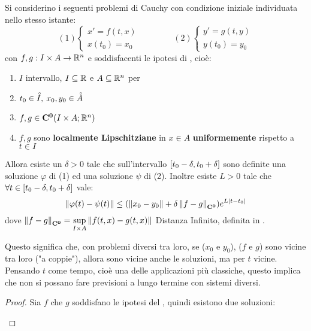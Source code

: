 \begin{theorem}
	\label{teo:cau_locale_part_2}
	Si considerino i seguenti problemi di Cauchy con condizione iniziale individuata nello stesso istante:
	\begin{equation}
		\label{eq:ipot_cau_part_2}
		(1)\begin{cases}x'=f(t,x)\\x(t_0)=x_0\end{cases}
		\qquad\qquad
		(2)\begin{cases}y'=g(t,y)\\y(t_0)=y_0\end{cases}
	\end{equation}
	con $f,g:I\times A \to \mathbb{R}^n$ e soddisfacenti le ipotesi di , cioè:
	\begin{enumerate}
		\item $I$ intervallo, $I \subseteq \mathbb{R}$ e $A\subseteq \mathbb{R}^n$ per 
		\item $t_0\in \accentset{\circ}{I},\:x_0, y_0\in \accentset{\circ}{A}$
		\item $f,g\in \mathbf{C^{0}}(I\times A; \mathbb{R}^n)$
		\item $f,g$ sono \textbf{localmente Lipschitziane} in $x\in A$ \textbf{uniformemente} rispetto a $t\in I$
	\end{enumerate}
	Allora esiste un $\delta >0$ tale che sull'intervallo $\left[t_0-\delta,t_0+\delta\right]$ sono definite una soluzione $\varphi$ di (1) ed una soluzione $\psi$ di (2). Inoltre esiste $L>0$ tale che $\forall t\in \left[t_0-\delta,t_0+\delta\right]$ vale:
	\[\left\|\varphi(t)-\psi(t)\right\|  \leq (\left\|x_0-y_0\right\|+\delta\left\|f-g\right\|_{\mathbf{C^{0}}})e^{L\left|t-t_0\right|}\]
	dove $\left\|f-g\right\|_{\mathbf{C^{0}}}=\sup\limits_{I\times A}\left\|f(t,x)-g(t,x)\right\|$ Distanza Infinito, definita in .
	\begin{note}
		Questo significa che, con problemi diversi tra loro, se ($x_0$ e $y_0$), ($f$ e $g$) sono vicine tra loro ("a coppie"), allora sono vicine anche le soluzioni, ma per $t$ vicine.
		Pensando $t$ come tempo, cioè una delle applicazioni più classiche, questo implica che non si possano fare previsioni a lungo termine con sistemi diversi.
	\end{note}
	\begin{proof}
		Sia $f$ che $g$ soddisfano le ipotesi del , quindi esistono due soluzioni:
		\begin{itemize}

\end{itemize}
\end{proof}
\end{theorem}
